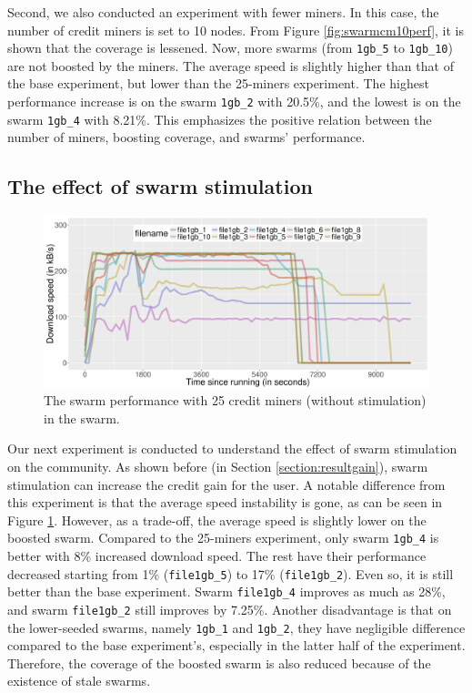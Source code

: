 Second, we also conducted an experiment with fewer miners. In this case, the number of credit miners is set to 10 nodes. From Figure \ref{fig:swarmcm10perf}, it is shown that the coverage is lessened. Now, more swarms (from \texttt{1gb\_5} to \texttt{1gb\_10}) are not boosted by the miners. The average speed is slightly higher than that of the base experiment, but lower than the 25-miners experiment. The highest performance increase is on the swarm \texttt{1gb\_2} with 20.5\%, and the lowest is on the swarm \texttt{1gb\_4} with 8.21\%. This emphasizes the positive relation between the number of miners, boosting coverage, and swarms' performance.


\subsection{The effect of swarm stimulation}
\begin{figure}[h!]
	\centering
	\includegraphics[width=\textwidth]{pics/results/swperf_sc1_notrig.png}
	\caption{The swarm performance with 25 credit miners (without stimulation) in the swarm.}
	\label{fig:swarmcm25perfnotrig}
\end{figure}

Our next experiment is conducted to understand the effect of swarm stimulation on the community. As shown before (in Section \ref{section:resultgain}), swarm stimulation can increase the credit gain for the user. A notable difference from this experiment is that the average speed instability is gone, as can be seen in Figure \ref{fig:swarmcm25perfnotrig}. However, as a trade-off, the average speed is slightly lower on the boosted swarm. Compared to the 25-miners experiment, only swarm \texttt{1gb\_4} is better with 8\% increased download speed. The rest have their performance decreased starting from 1\% (\texttt{file1gb\_5}) to 17\% (\texttt{file1gb\_2}). Even so, it is still better than the base experiment. Swarm \texttt{file1gb\_4} improves as much as 28\%, and swarm \texttt{file1gb\_2} still improves by 7.25\%. Another disadvantage is that on the lower-seeded swarms, namely \texttt{1gb\_1} and \texttt{1gb\_2}, they have negligible difference compared to the base experiment's, especially in the latter half of the experiment. Therefore, the coverage of the boosted swarm is also reduced because of the existence of stale swarms. 

